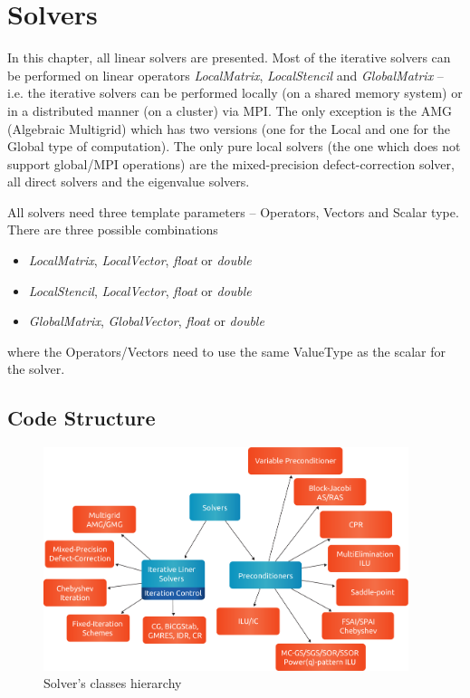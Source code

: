 \chapter{Solvers}

In this chapter, all linear solvers are presented. Most of the iterative solvers can be performed on linear operators \emph{LocalMatrix}, \emph{LocalStencil} and \emph{GlobalMatrix} -- i.e. the iterative solvers can be performed locally (on a shared memory system) or in a distributed manner (on a cluster) via MPI. The only exception is the AMG (Algebraic Multigrid) which has two versions (one for the Local and one for the Global type of computation). The only pure local solvers (the one which does not support global/MPI operations) are the mixed-precision defect-correction solver, all direct solvers and the eigenvalue solvers.

All solvers need three template parameters -- Operators, Vectors and Scalar type. There are three possible combinations
\begin{itemize}
\itemsep0em
 \item \emph{LocalMatrix}, \emph{LocalVector}, \emph{float} or \emph{double}
 \item \emph{LocalStencil}, \emph{LocalVector}, \emph{float} or \emph{double}
 \item \emph{GlobalMatrix}, \emph{GlobalVector}, \emph{float} or \emph{double}
\end{itemize}

where the Operators/Vectors need to use the same ValueType as the scalar for the solver.

\section{Code Structure}

\begin{figure}[!ht]
\centering
\includegraphics[width=0.95\textwidth]{./fig/solver.pdf}
\caption{Solver's classes hierarchy}
\label{paralution-solvers}
\end{figure}


